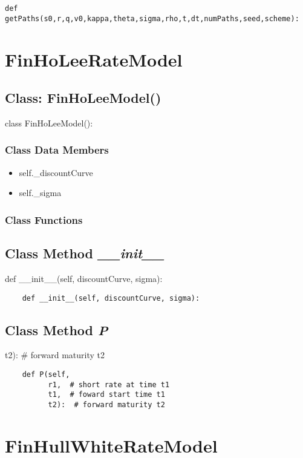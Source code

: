 \documentclass[twoside,11pt]{book}
\begin{document}
\begin{lstlisting}
def getPaths(s0,r,q,v0,kappa,theta,sigma,rho,t,dt,numPaths,seed,scheme):
\end{lstlisting}

\newpage
\section{FinHoLeeRateModel}

\subsection{Class: FinHoLeeModel()}
class FinHoLeeModel():

\subsubsection{Class Data Members}
\begin{itemize}
\item{self.\_discountCurve}
\item{self.\_sigma}
\end{itemize}

\subsubsection{Class Functions}

\subsection{Class Method {\it \_\_init\_\_}}
def \_\_init\_\_(self, discountCurve, sigma):

\begin{lstlisting}
    def __init__(self, discountCurve, sigma):
\end{lstlisting}

\subsection{Class Method {\it P}}
t2):  \# forward maturity t2

\begin{lstlisting}
    def P(self,
          r1,  # short rate at time t1
          t1,  # foward start time t1
          t2):  # forward maturity t2
\end{lstlisting}

\newpage
\section{FinHullWhiteRateModel}
\end{document}
